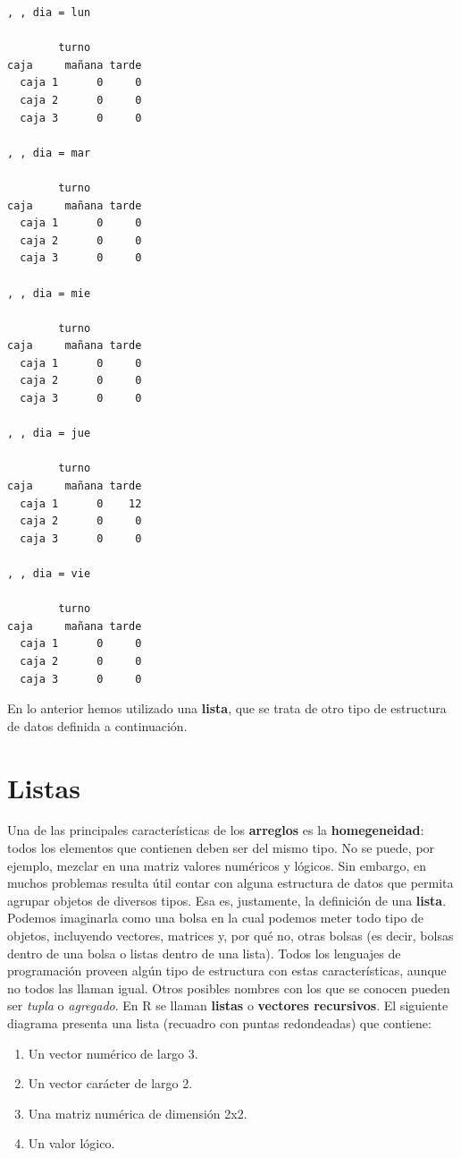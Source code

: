 \documentclass[
]{book}
\providecommand{\tightlist}{%
  \setlength{\itemsep}{0pt}\setlength{\parskip}{0pt}}
\begin{document}
\begin{verbatim}
, , dia = lun

        turno
caja     mañana tarde
  caja 1      0     0
  caja 2      0     0
  caja 3      0     0

, , dia = mar

        turno
caja     mañana tarde
  caja 1      0     0
  caja 2      0     0
  caja 3      0     0

, , dia = mie

        turno
caja     mañana tarde
  caja 1      0     0
  caja 2      0     0
  caja 3      0     0

, , dia = jue

        turno
caja     mañana tarde
  caja 1      0    12
  caja 2      0     0
  caja 3      0     0

, , dia = vie

        turno
caja     mañana tarde
  caja 1      0     0
  caja 2      0     0
  caja 3      0     0
\end{verbatim}

En lo anterior hemos utilizado una \textbf{lista}, que se trata de otro tipo de estructura de datos definida a continuación.

\hypertarget{listas}{%
\section{Listas}\label{listas}}

Una de las principales características de los \textbf{arreglos} es la \textbf{homegeneidad}: todos los elementos que contienen deben ser del mismo tipo. No se puede, por ejemplo, mezclar en una matriz valores numéricos y lógicos. Sin embargo, en muchos problemas resulta útil contar con alguna estructura de datos que permita agrupar objetos de diversos tipos. Esa es, justamente, la definición de una \textbf{lista}. Podemos imaginarla como una bolsa en la cual podemos meter todo tipo de objetos, incluyendo vectores, matrices y, por qué no, otras bolsas (es decir, bolsas dentro de una bolsa o listas dentro de una lista). Todos los lenguajes de programación proveen algún tipo de estructura con estas características, aunque no todos las llaman igual. Otros posibles nombres con los que se conocen pueden ser \emph{tupla} o \emph{agregado}. En R se llaman \textbf{listas} o \textbf{vectores recursivos}. El siguiente diagrama presenta una lista (recuadro con puntas redondeadas) que contiene:

\begin{enumerate}
\def\labelenumi{\arabic{enumi}.}
\tightlist
\item
  Un vector numérico de largo 3.
\item
  Un vector carácter de largo 2.
\item
  Una matriz numérica de dimensión 2x2.
\item
  Un valor lógico.
\end{enumerate}
\end{document}

